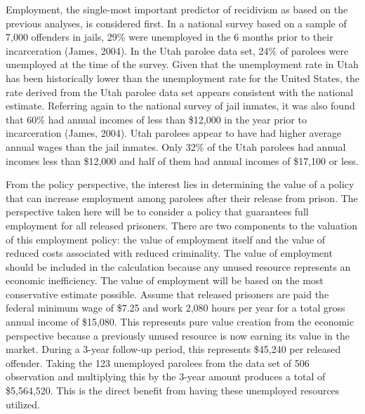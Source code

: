 Employment, the single-most important predictor of recidivism as based on the previous analyses, is considered first.  In a national survey based on a sample of 7,000 offenders in jails, 29\% were unemployed in the 6 months prior to their incarceration (James, 2004).  In the Utah parolee data set, 24\% of parolees were unemployed at the time of the survey.  Given that the unemployment rate in Utah has been historically lower than the unemployment rate for the United States, the rate derived from the Utah parolee data set appears consistent with the national estimate.  Referring again to the national survey of jail inmates, it was also found that 60\% had annual incomes of less than \$12,000 in the year prior to incarceration (James, 2004).  Utah parolees appear to have had higher average annual wages than the jail inmates.  Only 32\% of the Utah parolees had annual incomes less than \$12,000 and half of them had annual incomes of \$17,100 or less.

From the policy perspective, the interest lies in determining the value of a policy that can increase employment among parolees after their release from prison.  The perspective taken here will be to consider a policy that guarantees full employment for all released prisoners.  There are two components to the valuation of this employment policy:  the value of employment itself and the value of reduced costs associated with reduced criminality.  The value of employment should be included in the calculation because any unused resource represents an economic inefficiency.  The value of employment will be based on the most conservative estimate possible.  Assume that released prisoners are paid the federal minimum wage of \$7.25 and work 2,080 hours per year for a total gross annual income of \$15,080.  This represents pure value creation from the economic perspective because a previously unused resource is now earning its value in the market.  During a 3-year follow-up period, this represents \$45,240 per released offender.  Taking the 123 unemployed parolees from the data set of 506 observation and multiplying this by the 3-year amount produces a total of \$5,564,520.  This is the direct benefit from having these unemployed resources utilized.


